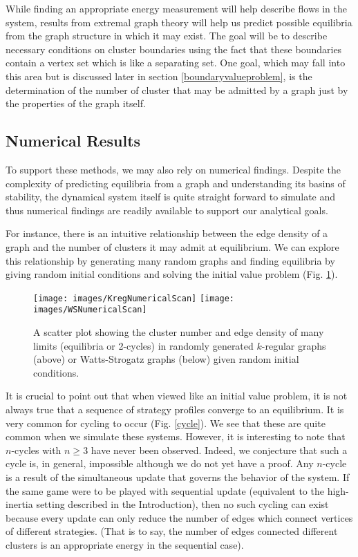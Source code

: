 \documentclass[]{article}
\begin{document}
		While finding an appropriate energy measurement will help describe flows in the system, results from extremal graph theory will help us predict possible equilibria from the graph structure in which it may exist. The goal will be to describe necessary conditions on cluster boundaries using the fact that these boundaries contain a vertex set which is like a separating set\cite{ExtremalGraphTheory}. One goal, which may fall into this area but is discussed later in section \ref{boundaryvalueproblem}, is the determination of the number of cluster that may be admitted by a graph just by the properties of the graph itself. 
		\subsection{Numerical Results}\label{numericalresults}
		To support these methods, we may also rely on numerical findings. Despite the complexity of predicting equilibria from a graph and understanding its basins of stability, the dynamical system itself is quite straight forward to simulate and thus numerical findings are readily available to support our analytical goals. 
		
		For instance, there is an intuitive relationship between the edge density of a graph and the number of clusters it may admit at equilibrium. We can explore this relationship by generating many random graphs and finding equilibria by giving random initial conditions and solving the initial value problem (Fig. \ref{NumericalScan}). 
		\begin{figure}
			\texttt{[image: images/KregNumericalScan]}
			\texttt{[image: images/WSNumericalScan]}
			\caption{A scatter plot showing the cluster number and edge density of many limits (equilibria or 2-cycles) in randomly generated $k$-regular graphs (above) or Watts-Strogatz graphs (below) given random initial conditions.}
			\label{NumericalScan}
		\end{figure}
		
		
		It is crucial to point out that when viewed like an initial value problem, it is not always true that a sequence of strategy profiles converge to an equilibrium. It is very common for cycling to occur (Fig. \ref{cycle}). We see that these are quite common when we simulate these systems. However, it is interesting to note that $n$-cycles with $n\geq 3$ have never been observed. Indeed, we conjecture that such a cycle is, in general, impossible although we do not yet have a proof. Any $n$-cycle is a result of the simultaneous update that governs the behavior of the system. If the same game were to be played with sequential update (equivalent to the high-inertia setting described in the Introduction), then no such cycling can exist because every update can only reduce the number of edges which connect vertices of different strategies. (That is to say, the number of edges connected different clusters is an appropriate energy in the sequential case).
		
\end{document}
